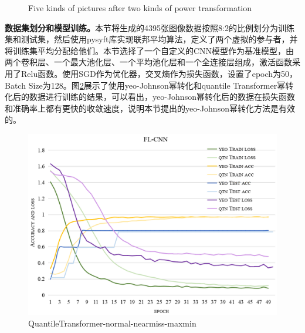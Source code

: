 \begin{figure}[htb]
    \centering
    \caption{Five kinds of pictures after two kinds of power transformation}
    \label{fig:five picture after yeo and qtn}
\end{figure}

\textbf{数据集划分和模型训练。}\label{subsection:Dataset_split_and_model_training}本节将生成的4395张图像数据按照8:2的比例划分为训练集和测试集，然后使用pysyft库实现联邦平均算法，定义了两个虚拟的参与者，并将训练集平均分配给他们。本节选择了一个自定义的CNN模型作为基准模型，由两个卷积层、一个最大池化层、一个平均池化层和一个全连接层组成，激活函数采用了Relu函数。使用SGD作为优化器，交叉熵作为损失函数，设置了epoch为50，Batch Size为128。图\ref{fig:FL_CNN}展示了使用yeo-Johnson幂转化和quantile Transformer幂转化后的数据进行训练的结果，可以看出，yeo-Johnson幂转化后的数据在损失函数和准确率上都有更快的收敛速度，说明本节提出的yeo-Johnson幂转化方法是有效的。

\begin{figure}[htb]
    \centering
    \includegraphics[width=0.45 \textwidth]{figures/FL_CNN.png}
    \caption{QuantileTransformer-normal-nearmiss-maxmin}
    \label{fig:FL_CNN}
\end{figure}

